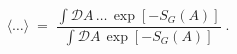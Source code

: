 \begin{equation}
\langle \ldots \rangle \;=\; \frac{\int {\mathcal D}A \,
\ldots \, \exp [ - S_G(A) ]}{\int {\mathcal D}A \, \exp [ - S_G(A) ]}
\;.
\end{equation}

